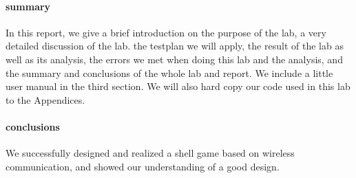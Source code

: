 \paragraph{summary}
In this report, we give a brief introduction on the purpose of the lab, a very detailed
discussion of the lab. the testplan we will apply, the result of the lab as well as its analysis, the
errors we met when doing this lab and the analysis, and the summary and conclusions of the whole
lab and report. We include a little user manual in the third section. We will also hard copy our code used in this lab to the Appendices.
\paragraph{conclusions}
We successfully designed and realized a shell game based on wireless communication, and showed our understanding of a good design.